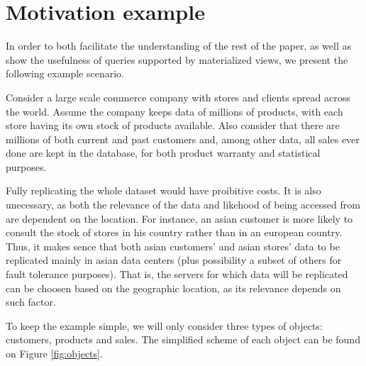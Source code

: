 \documentclass[sigplan,10pt]{acmart}
\begin{document}

\section{Motivation example}
\label{sec:example}


In order to both facilitate the understanding of the rest of the paper, as well as show the usefulness of queries supported by materialized views, we present the following example scenario.

Consider a large scale commerce company with stores and clients spread across the world.
Assume the company keeps data of millions of products, with each store having its own stock of products available.
Also consider that there are millions of both current and past customers and, among other data, all sales ever done are kept in the database, for both product warranty and statistical purposes.

Fully replicating the whole dataset would have proibitive costs.
It is also unecessary, as both the relevance of the data and likehood of being accessed from are dependent on the location.
For instance, an asian customer is more likely to consult the stock of stores in his country rather than in an european country.
Thus, it makes sence that both asian customers' and asian stores' data to be replicated mainly in asian data centers (plus possibility a subset of others for fault tolerance purposes).
That is, the servers for which data will be replicated can be choosen based on the geographic location, as its relevance depends on such factor.

To keep the example simple, we will only consider three types of objects: customers, products and sales.
The simplified scheme of each object can be found on Figure \ref{fig:objects}.
\end{document}
